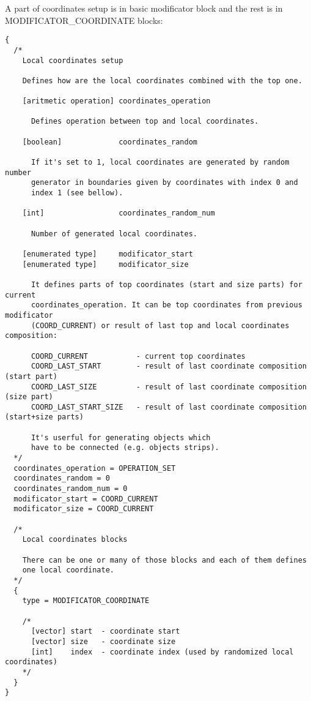 \documentclass[9pt]{article}
\begin{document}
A part of coordinates setup is in basic modificator block and the rest 
is in MODIFICATOR\_COORDINATE blocks:
\begin{verbatim}
{
  /*
    Local coordinates setup
    
    Defines how are the local coordinates combined with the top one.
  
    [aritmetic operation] coordinates_operation 
    
      Defines operation between top and local coordinates.
    
    [boolean]             coordinates_random
    
      If it's set to 1, local coordinates are generated by random number
      generator in boundaries given by coordinates with index 0 and 
      index 1 (see bellow).
      
    [int]                 coordinates_random_num
    
      Number of generated local coordinates.
    
    [enumerated type]     modificator_start
    [enumerated type]     modificator_size
      
      It defines parts of top coordinates (start and size parts) for current 
      coordinates_operation. It can be top coordinates from previous modificator 
      (COORD_CURRENT) or result of last top and local coordinates composition:
      
      COORD_CURRENT           - current top coordinates
      COORD_LAST_START        - result of last coordinate composition (start part)
      COORD_LAST_SIZE         - result of last coordinate composition (size part)
      COORD_LAST_START_SIZE   - result of last coordinate composition (start+size parts)
      
      It's userful for generating objects which 
      have to be connected (e.g. objects strips).
  */  
  coordinates_operation = OPERATION_SET
  coordinates_random = 0
  coordinates_random_num = 0
  modificator_start = COORD_CURRENT
  modificator_size = COORD_CURRENT
  
  /*
    Local coordinates blocks
    
    There can be one or many of those blocks and each of them defines
    one local coordinate.
  */
  {
    type = MODIFICATOR_COORDINATE
    
    /*
      [vector] start  - coordinate start
      [vector] size   - coordinate size
      [int]    index  - coordinate index (used by randomized local coordinates)
    */
  }
}
\end{verbatim}
\end{document}
